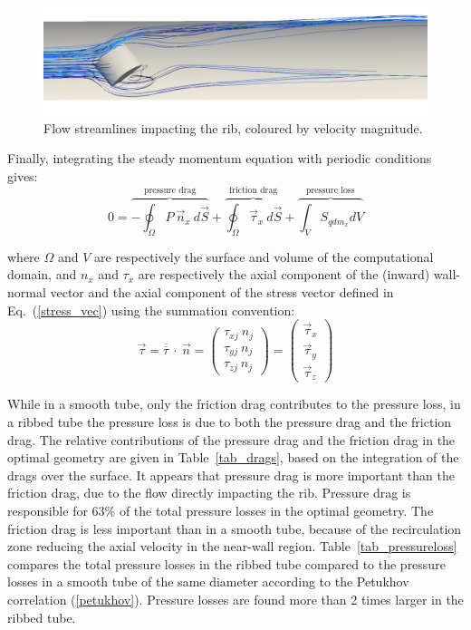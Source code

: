 \begin{figure}[!ht]
\centering
\includegraphics[width=\linewidth]{fig/applications/optim/Streamlines.png}
\caption{Flow streamlines impacting the rib, coloured by velocity magnitude.}
\label{streamlines}
\end{figure}

Finally, integrating the steady momentum equation with periodic conditions gives:
\begin{equation}
0 = \overbrace{- \oint_{\Omega} P ~ \vec{n}_x ~ d\vec{S}}^{\text{pressure drag}} + \overbrace{\oint_{\Omega} \vec{\tau}_x ~ d\vec{S}}^{\text{friction drag}} + \overbrace{\int_V S_{qdm_x} dV}^{\text{pressure loss}}
\label{momentum_eq}
\end{equation}

\noindent where $\Omega$ and $V$ are respectively the surface and volume of the computational domain, and $n_x$ and $\tau_x$ are respectively the axial component of the (inward) wall-normal vector and the axial component of the stress vector defined in Eq.~(\ref{stress_vec}) using the summation convention:
\begin{equation}
\vec{\tau} = \overline{\overline{\tau}} ~ \cdot ~ \vec{n} = \begin{pmatrix} \tau_{xj} ~ n_j \\ \tau_{yj} ~ n_j \\ \tau_{zj} ~ n_j \end{pmatrix} = \begin{pmatrix} \vec{\tau}_x \\ \vec{\tau}_y \\ \vec{\tau}_z \end{pmatrix}
\label{stress_vec}
\end{equation}

While in a smooth tube, only the friction drag contributes to the pressure loss, in a ribbed tube the pressure loss is due to both the pressure drag and the friction drag. The relative contributions of the pressure drag and the friction drag in the optimal geometry are given in Table~\ref{tab_drags}, based on the integration of the drags over the surface. It appears that pressure drag is more important than the friction drag, due to the flow directly impacting the rib. Pressure drag is responsible for $63 \%$ of the total pressure losses in the optimal geometry. The friction drag is less important than in a smooth tube, because of the recirculation zone reducing the axial velocity in the near-wall region. Table~\ref{tab_pressureloss} compares the total pressure losses in the ribbed tube compared to the pressure losses in a smooth tube of the same diameter according to the Petukhov correlation \cite{PetukhovPopov1963} (\cref{petukhov}). Pressure losses are found more than 2 times larger in the ribbed tube.

